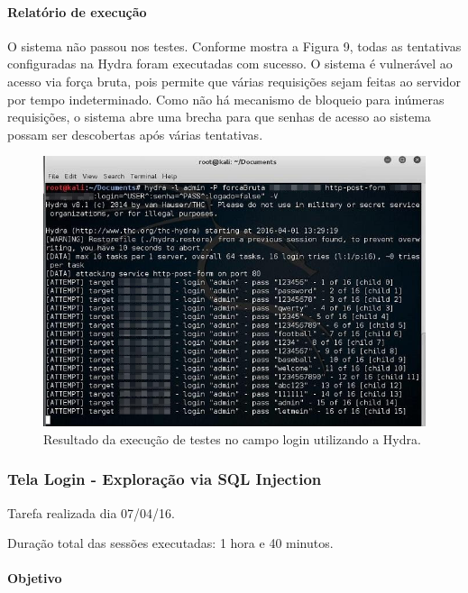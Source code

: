 \documentclass[
    12pt,               %
    openright,          %
    oneside,            %
    a4paper,            %
    section=TITLE,     %
    english,            %
    french,             %
    spanish,            %
    brazil              %
    ]{abntex2}
\begin{document}
\paragraph*{Relatório de execução}

O sistema não passou nos testes. Conforme mostra a Figura 9, todas as tentativas configuradas na Hydra foram executadas com sucesso. O sistema é vulnerável ao acesso via força bruta, pois permite que várias requisições sejam feitas ao servidor por tempo indeterminado. Como não há mecanismo de bloqueio para inúmeras requisições, o sistema abre uma brecha para que senhas de acesso ao sistema possam ser descobertas após várias tentativas.





\begin{figure}[htp]
\centering
\caption{Resultado da execução de testes no campo login utilizando a Hydra.}
\includegraphics[width=450px]{image1.jpeg}
\end{figure}
\ifdefined\FloatBarrier \FloatBarrier \fi





\subsubsection*{Tela Login - Exploração via SQL Injection}

Tarefa realizada dia 07/04/16.


Duração total das sessões executadas: 1 hora e 40 minutos.



\paragraph*{Objetivo}
\end{document}
